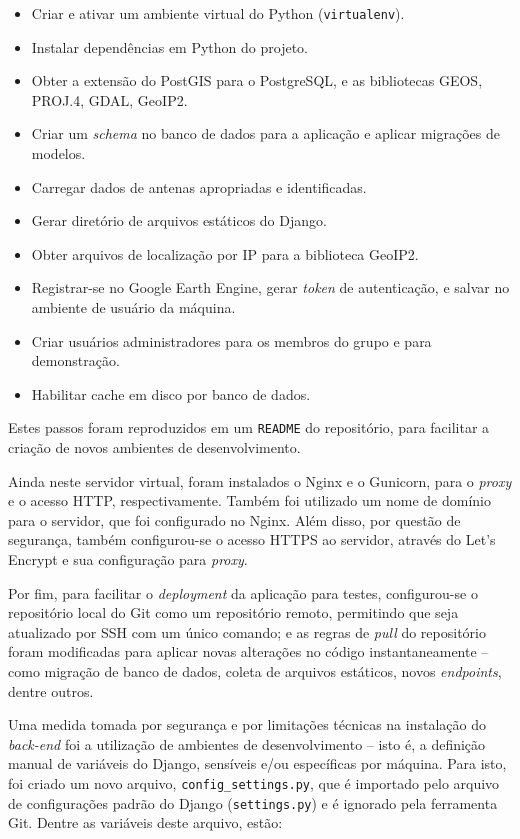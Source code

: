 \documentclass[]{politex}
\begin{document}
\begin{itemize}
\item Criar e ativar um ambiente virtual do Python (\texttt{virtualenv}).
\item Instalar dependências em Python do projeto.
\item Obter a extensão do PostGIS para o PostgreSQL, e as bibliotecas GEOS,
PROJ.4, GDAL, GeoIP2.
\item Criar um \textit{schema} no banco de dados para a aplicação e aplicar
migrações de modelos.
\item Carregar dados de antenas apropriadas e identificadas.
\item Gerar diretório de arquivos estáticos do Django.
\item Obter arquivos de localização por IP para a biblioteca GeoIP2.
\item Registrar-se no Google Earth Engine, gerar \textit{token} de autenticação,
e salvar no ambiente de usuário da máquina.
\item Criar usuários administradores para os membros do grupo e para
demonstração.
\item Habilitar cache em disco por banco de dados.
\end{itemize}

Estes passos foram reproduzidos em um \texttt{README} do repositório, para
facilitar a criação de novos ambientes de desenvolvimento.

Ainda neste servidor virtual, foram instalados o Nginx e o Gunicorn, para o
\textit{proxy} e o acesso HTTP, respectivamente. Também foi utilizado um nome de
domínio para o servidor, que foi configurado no Nginx. Além disso, por questão
de segurança, também configurou-se o acesso HTTPS ao servidor, através do Let's
Encrypt e sua configuração para \textit{proxy}.

Por fim, para facilitar o \textit{deployment} da aplicação para testes,
configurou-se o repositório local do Git como um repositório remoto, permitindo
que seja atualizado por SSH com um único comando; e as regras de \textit{pull}
do repositório foram modificadas para aplicar novas alterações no código
instantaneamente -- como migração de banco de dados, coleta de arquivos
estáticos, novos \textit{endpoints}, dentre outros.

Uma medida tomada por segurança e por limitações técnicas na instalação do
\textit{back-end} foi a utilização de ambientes de desenvolvimento -- isto é, a
definição manual de variáveis do Django, sensíveis e/ou específicas por máquina.
Para isto, foi criado um novo arquivo, \texttt{config\_settings.py}, que é
importado pelo arquivo de configurações padrão do Django (\texttt{settings.py})
e é ignorado pela ferramenta Git. Dentre as variáveis deste arquivo, estão:
\end{document}
